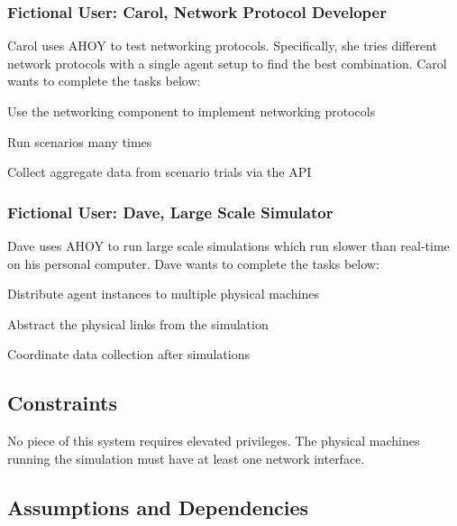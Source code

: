 \documentclass[titlepage]{article}
\begin{document}
\subsubsection{Fictional User: Carol, Network Protocol Developer%
  \label{bob}%
}

Carol uses AHOY to test networking protocols.  Specifically, she tries different network protocols with a single agent setup to find the best combination.  Carol wants to complete the tasks below:

\begin{itemize*}
    \item Use the networking component to implement networking protocols
    \item Run scenarios many times
    \item Collect aggregate data from scenario trials via the API
\end{itemize*}

\subsubsection{Fictional User: Dave, Large Scale Simulator%
  \label{bob}%
}

Dave uses AHOY to run large scale simulations which run slower than real-time on his personal computer.  Dave wants to complete the tasks below:

\begin{itemize*}
    \item Distribute agent instances to multiple physical machines
    \item Abstract the physical links from the simulation
    \item Coordinate data collection after simulations
\end{itemize*}

\subsection{Constraints%
  \label{constraints}%
}

No piece of this system requires elevated privileges.  The physical machines running the simulation must have at least one network interface.


\subsection{Assumptions and Dependencies%
  \label{assumptions-and-dependencies}%
}
\end{document}
